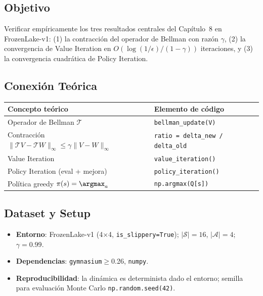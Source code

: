\bigskip

\subsection*{Objetivo}

Verificar empíricamente los tres resultados centrales del Capítulo~8 en
FrozenLake-v1: (1) la contracción del operador de Bellman con razón $\gamma$,
(2) la convergencia de Value Iteration en $O(\log(1/\epsilon)/(1-\gamma))$
iteraciones, y (3) la convergencia cuadrática de Policy Iteration.

\subsection*{Conexión Teórica}

\begin{center}
\small
\begin{tabular}{ll}
\toprule
\textbf{Concepto teórico} & \textbf{Elemento de código} \\
\midrule
Operador de Bellman $\mathcal{T}$ & \texttt{bellman\_update(V)} \\
Contracción $\|\mathcal{T}V - \mathcal{T}W\|_\infty \leq \gamma\|V-W\|_\infty$ & \texttt{ratio = delta\_new / delta\_old} \\
Value Iteration & \texttt{value\_iteration()} \\
Policy Iteration (eval + mejora) & \texttt{policy\_iteration()} \\
Política greedy $\pi(s) = \argmax_a$ & \texttt{np.argmax(Q[s])} \\
\bottomrule
\end{tabular}
\end{center}

\subsection*{Dataset y Setup}

\begin{itemize}
  \item \textbf{Entorno}: FrozenLake-v1 (4$\times$4, \texttt{is\_slippery=True});
    $|\mathcal{S}|=16$, $|\mathcal{A}|=4$; $\gamma=0.99$.
  \item \textbf{Dependencias}: \texttt{gymnasium}$\geq$0.26, \texttt{numpy}.
  \item \textbf{Reproducibilidad}: la dinámica es determinista dado el entorno;
    semilla para evaluación Monte Carlo \texttt{np.random.seed(42)}.
\end{itemize}

